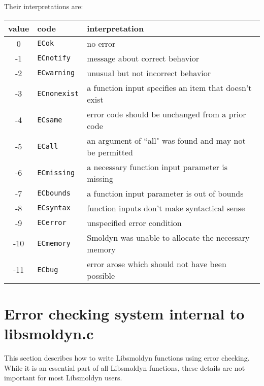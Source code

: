 \documentclass {book}
\begin{document}
Their interpretations are:

\begin{longtable}[c]{cll}
value & code & interpretation\\
\hline
0 & \texttt{ECok} & no error\\
-1 & \texttt{ECnotify} & message about correct behavior\\
-2 & \texttt{ECwarning} & unusual but not incorrect behavior\\
-3 & \texttt{ECnonexist} & a function input specifies an item that doesn't exist\\
-4 & \texttt{ECsame} & error code should be unchanged from a prior code\\
-5 & \texttt{ECall} & an argument of ``all" was found and may not be permitted\\
-6 & \texttt{ECmissing} & a necessary function input parameter is missing\\
-7 & \texttt{ECbounds} & a function input parameter is out of bounds\\
-8 & \texttt{ECsyntax} & function inputs don't make syntactical sense\\
-9 & \texttt{ECerror} & unspecified error condition\\
-10 & \texttt{ECmemory} & Smoldyn was unable to allocate the necessary memory\\
-11 & \texttt{ECbug} & error arose which should not have been possible\\

\end{longtable}

\section{Error checking system internal to libsmoldyn.c}

This section describes how to write Libsmoldyn functions using error checking. While it is an essential part of all Libsmoldyn functions, these details are not important for most Libsmoldyn users.
\end{document}
